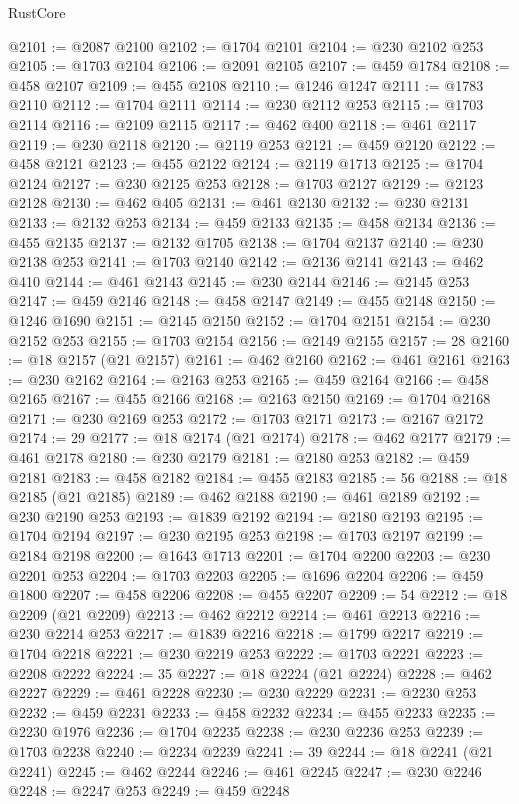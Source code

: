 \begin{lexlean}{RustCore}
\begin{coremodule}
@2101 := @2087 @2100
@2102 := @1704 @2101
@2104 := @230 @2102 @253
@2105 := @1703 @2104
@2106 := @2091 @2105
@2107 := @459 @1784
@2108 := @458 @2107
@2109 := @455 @2108
@2110 := @1246 @1247
@2111 := @1783 @2110
@2112 := @1704 @2111
@2114 := @230 @2112 @253
@2115 := @1703 @2114
@2116 := @2109 @2115
@2117 := @462 @400
@2118 := @461 @2117
@2119 := @230 @2118
@2120 := @2119 @253
@2121 := @459 @2120
@2122 := @458 @2121
@2123 := @455 @2122
@2124 := @2119 @1713
@2125 := @1704 @2124
@2127 := @230 @2125 @253
@2128 := @1703 @2127
@2129 := @2123 @2128
@2130 := @462 @405
@2131 := @461 @2130
@2132 := @230 @2131
@2133 := @2132 @253
@2134 := @459 @2133
@2135 := @458 @2134
@2136 := @455 @2135
@2137 := @2132 @1705
@2138 := @1704 @2137
@2140 := @230 @2138 @253
@2141 := @1703 @2140
@2142 := @2136 @2141
@2143 := @462 @410
@2144 := @461 @2143
@2145 := @230 @2144
@2146 := @2145 @253
@2147 := @459 @2146
@2148 := @458 @2147
@2149 := @455 @2148
@2150 := @1246 @1690
@2151 := @2145 @2150
@2152 := @1704 @2151
@2154 := @230 @2152 @253
@2155 := @1703 @2154
@2156 := @2149 @2155
@2157 := 28
@2160 := @18 @2157 (@21 @2157)
@2161 := @462 @2160
@2162 := @461 @2161
@2163 := @230 @2162
@2164 := @2163 @253
@2165 := @459 @2164
@2166 := @458 @2165
@2167 := @455 @2166
@2168 := @2163 @2150
@2169 := @1704 @2168
@2171 := @230 @2169 @253
@2172 := @1703 @2171
@2173 := @2167 @2172
@2174 := 29
@2177 := @18 @2174 (@21 @2174)
@2178 := @462 @2177
@2179 := @461 @2178
@2180 := @230 @2179
@2181 := @2180 @253
@2182 := @459 @2181
@2183 := @458 @2182
@2184 := @455 @2183
@2185 := 56
@2188 := @18 @2185 (@21 @2185)
@2189 := @462 @2188
@2190 := @461 @2189
@2192 := @230 @2190 @253
@2193 := @1839 @2192
@2194 := @2180 @2193
@2195 := @1704 @2194
@2197 := @230 @2195 @253
@2198 := @1703 @2197
@2199 := @2184 @2198
@2200 := @1643 @1713
@2201 := @1704 @2200
@2203 := @230 @2201 @253
@2204 := @1703 @2203
@2205 := @1696 @2204
@2206 := @459 @1800
@2207 := @458 @2206
@2208 := @455 @2207
@2209 := 54
@2212 := @18 @2209 (@21 @2209)
@2213 := @462 @2212
@2214 := @461 @2213
@2216 := @230 @2214 @253
@2217 := @1839 @2216
@2218 := @1799 @2217
@2219 := @1704 @2218
@2221 := @230 @2219 @253
@2222 := @1703 @2221
@2223 := @2208 @2222
@2224 := 35
@2227 := @18 @2224 (@21 @2224)
@2228 := @462 @2227
@2229 := @461 @2228
@2230 := @230 @2229
@2231 := @2230 @253
@2232 := @459 @2231
@2233 := @458 @2232
@2234 := @455 @2233
@2235 := @2230 @1976
@2236 := @1704 @2235
@2238 := @230 @2236 @253
@2239 := @1703 @2238
@2240 := @2234 @2239
@2241 := 39
@2244 := @18 @2241 (@21 @2241)
@2245 := @462 @2244
@2246 := @461 @2245
@2247 := @230 @2246
@2248 := @2247 @253
@2249 := @459 @2248

\end{coremodule}
\end{lexlean}

